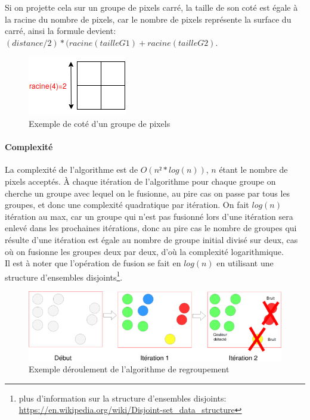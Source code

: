 \documentclass[12pt]{report}
\begin{document}
Si on projette cela sur un groupe de pixels carré, la taille de son coté est égale à la racine du nombre de pixels, car le nombre de pixels représente la surface du carré, ainsi la formule devient: \textbf{$(distance/2)*(racine(tailleG1)+racine(tailleG2)$}.
\begin{figure}[H]
	\centering
	\includegraphics[scale=0.75]{imgs/GroupeSide.png}
	\caption{Exemple de coté d'un groupe de pixels}
	\label{fig:GroupeSide}
\end{figure}
\paragraph{Complexité}La complexité de l’algorithme est de $O(n²*log(n))$, $n$ étant le nombre de pixels acceptés. À chaque itération de l’algorithme pour chaque groupe on cherche un groupe avec lequel on le fusionne, au pire cas on passe par tous les groupes, et donc une complexité quadratique par itération. On fait $log(n)$ itération au max, car un groupe qui n’est pas fusionné lors d’une itération sera enlevé dans les prochaines itérations, donc au pire cas le nombre de groupes qui résulte d’une itération est égale au nombre de groupe initial divisé sur deux, cas où on fusionne les groupes deux par deux, d’où la complexité logarithmique.\\
Il est à noter que l'opération de fusion se fait en $log(n)$ en utilisant une structure d'ensembles disjoints\footnote{plus d'information sur la structure d'ensembles disjoints: \href{https://en.wikipedia.org/wiki/Disjoint-set_data_structure}{https://en.wikipedia.org/wiki/Disjoint-set\_data\_structure}}.
\begin{figure}[H]
	\centering
	\includegraphics[scale=0.75]{imgs/grouping1.png}
	\caption{Exemple déroulement de l'algorithme de regroupement}
	\label{fig:Grouping}
\end{figure}
\end{document}
